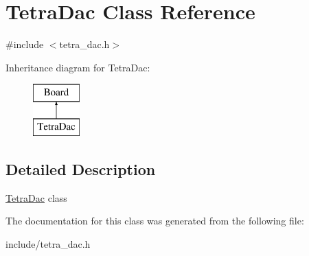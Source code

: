 \hypertarget{classTetraDac}{}\section{Tetra\+Dac Class Reference}
\label{classTetraDac}


{\ttfamily \#include $<$tetra\+\_\+dac.\+h$>$}

Inheritance diagram for Tetra\+Dac\+:\begin{figure}[H]
\begin{center}
\leavevmode
\includegraphics[height=2.000000cm]{classTetraDac}
\end{center}
\end{figure}


\subsection{Detailed Description}
\mbox{\hyperlink{classTetraDac}{Tetra\+Dac}} class 

The documentation for this class was generated from the following file\+:\begin{DoxyCompactItemize}
\item 
include/tetra\+\_\+dac.\+h\end{DoxyCompactItemize}
